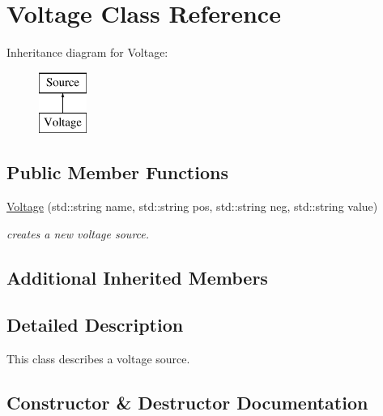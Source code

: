 \hypertarget{class_s_p_i_c_e_1_1_voltage}{}\section{Voltage Class Reference}
\label{class_s_p_i_c_e_1_1_voltage}
Inheritance diagram for Voltage\+:\begin{figure}[H]
\begin{center}
\leavevmode
\includegraphics[height=2.000000cm]{class_s_p_i_c_e_1_1_voltage}
\end{center}
\end{figure}
\subsection*{Public Member Functions}
\begin{DoxyCompactItemize}
\item 
\hyperlink{class_s_p_i_c_e_1_1_voltage_ae88c0ca0c1c79404c71ed3f4851a933d}{Voltage} (std\+::string name, std\+::string pos, std\+::string neg, std\+::string value)
\begin{DoxyCompactList}\small\item\em creates a new voltage source. \end{DoxyCompactList}\end{DoxyCompactItemize}
\subsection*{Additional Inherited Members}


\subsection{Detailed Description}
This class describes a voltage source. 

\subsection{Constructor \& Destructor Documentation}
\mbox{\label{class_s_p_i_c_e_1_1_voltage_ae88c0ca0c1c79404c71ed3f4851a933d}} 
